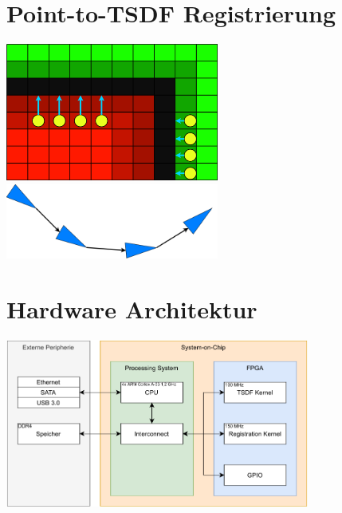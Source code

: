 \documentclass{beamer}
\begin{document}
\section{Point-to-TSDF Registrierung}
\begin{frame}{\secname}
\begin{center}
\includegraphics[width=7cm]{images/Reg_Gradient.png}
\includegraphics[width=7cm]{images/Pose_Graph.png}
\end{center}
\end{frame}

\section{Hardware Architektur}
\begin{frame}{\secname}
\begin{center}
\includegraphics[width=10cm]{images/Blockdiagram.pdf}
\end{center}
\end{frame}
\end{document}
